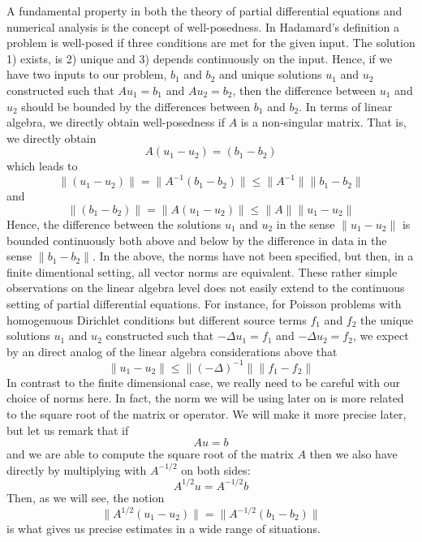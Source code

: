 A fundamental property in both the theory of partial differential equations and numerical analysis is the
concept of well-posedness. In Hadamard's definition a problem is well-posed if three conditions are met for the given input.  
The solution 1) exists, is 2) unique
and 3) depends continuously on the input. Hence, if we have two inputs to our problem, $b_1$ and $b_2$ 
and unique solutions $u_1$ and $u_2$ constructed  such that $A u_1 = b_1$ and $A u_2 = b_2$, then 
the difference between $u_1$ and $u_2$
should be bounded by the differences
between $b_1$ and $b_2$. In terms of linear algebra, we directly obtain well-posedness if
$A$ is a non-singular matrix. That is, we directly obtain 
\[
A(u_1 - u_2)  = (b_1 - b_2)     
\]
which leads to 
\[
	\|(u_1 - u_2) \| = \|A^{-1}(b_1 - b_2)\| \le  \|A^{-1}\| \|b_1 - b_2\|     
\]
and 
\[
	\|(b_1 - b_2) \| = \|A (u_1 - u_2)\|  \le  \|A\| \|u_1 - u_2\|     
\]
Hence, the difference between the solutions $u_1$ and $u_2$ in the sense 
$\|u_1 - u_2\|$ is bounded continuously both above and below by the difference in data in the sense $\|b_1 - b_2\|$.    
In the above, the norms have not been specified, but then, in a finite dimentional setting, all vector norms are equivalent.   
These rather simple observations on the linear algebra level does not easily extend to the continuous setting of partial differential equations. 
For instance, for Poisson problems with homogenuous Dirichlet conditions but different source terms $f_1$ and $f_2$ 
the unique solutions $u_1$ and $u_2$ constructed such that $-\Delta u_1 = f_1$ and $-\Delta u_2 = f_2$, 
we expect by an direct analog of the linear algebra considerations above that  
\[
	\|u_1 - u_2 \| \le \|(-\Delta)^{-1} \| \|f_1 - f_2\|     
\]
In contrast to the finite dimensional case, we really need to be careful with our choice of norms here. In fact, 
the norm we will be using later on is more related to the square root of the matrix or operator. 
We will make it more precise later, but let us remark that 
if 
\[
A u = b 
\]
and we are able to compute the square root of the matrix $A$ then we also have directly by multiplying with $A^{-1/2}$ on both sides:    
\[
A^{1/2} u = A^{-1/2} b 
\]
Then, as we will see,  the notion 
\[
	\|A^{1/2}(u_1 - u_2) \| = \|A^{-1/2}(b_1 - b_2)\|     
\]
is what gives us  precise estimates in a wide range of situations.  

